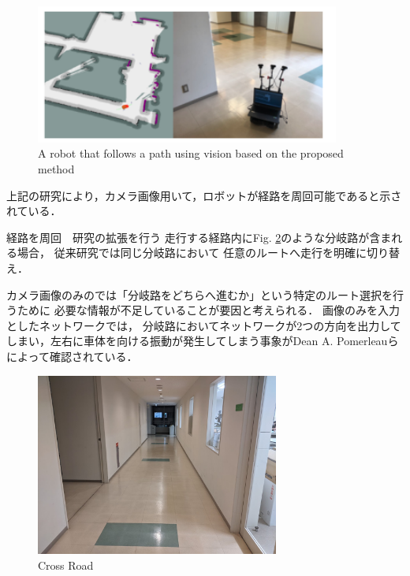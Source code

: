 \begin{figure}[h]
    \centering
    \includegraphics[width = 10cm]{./figs/okada.png}
    \caption{A robot that follows a path using vision based on the proposed method\cite{okada}}
    \label{fig::okada}
\end{figure}


上記の研究により，カメラ画像用いて，ロボットが経路を周回可能であると示されている．


経路を周回　研究の拡張を行う
走行する経路内にFig. \ref{fig::bunki}のような分岐路が含まれる場合，
従来研究では同じ分岐路において
任意のルートへ走行を明確に切り替え．

カメラ画像のみのでは「分岐路をどちらへ進むか」という特定のルート選択を行うために
必要な情報が不足していることが要因と考えられる．
画像のみを入力としたネットワークでは，
分岐路においてネットワークが2つの方向を出力してしまい，左右に車体を向ける振動が発生してしまう事象がDean A. Pomerleauら\cite{pomeru}によって確認されている．

\begin{figure}[h]
    \centering
    \includegraphics[width = 8cm]{./figs/bunki.jpg}
    \caption{Cross Road}
    \label{fig::bunki}
\end{figure}
\newpage

